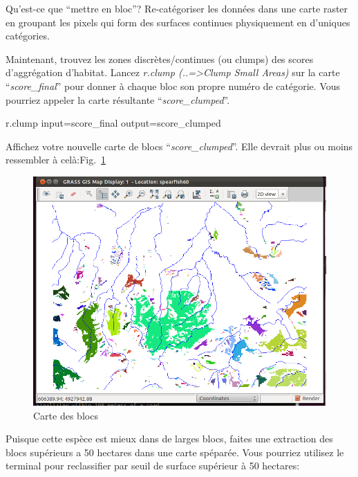 Qu'est-ce que ``mettre en bloc''?
Re-cat\'egoriser les donn\'ees dans une carte raster en groupant les pixels qui form des surfaces continues physiquement en d'uniques cat\'egories.

Maintenant, trouvez les zones discr\`etes/continues (ou clumps) des scores d'aggr\'egation d'habitat. 
Lancez \textit{r.clump (..=>Clump Small Areas) }sur la carte ``\textit{score\_final}'' pour donner \`a chaque bloc son propre num\'ero de cat\'egorie. Vous pourriez appeler la carte r\'esultante ``\textit{score\_clumped}''.

\begin{smallverbatim}
r.clump input=score_final output=score_clumped 
\end{smallverbatim}

Affichez votre nouvelle carte de blocs ``\textit{score\_clumped}''. Elle devrait plus ou moins ressembler \`a cel\`a:Fig.~\ref{fig:grass022}

\begin{figure}[htbp]
   \centering
   \includegraphics[scale=0.35]{grass022.png}
   \caption{Carte des blocs}
   \label{fig:grass022}
\end{figure}


Puisque cette esp\`ece est mieux dans de larges blocs, faites une extraction des blocs sup\'erieurs a 50 hectares dans une carte sp\'epar\'ee. Vous pourriez utilisez le terminal pour reclassifier par seuil de surface sup\'erieur \`a 50 hectares:

